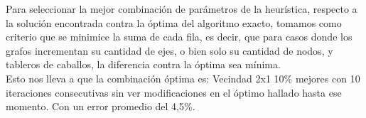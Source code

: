 \newpage

Para seleccionar la mejor combinaci\'on de par\'ametros de la heur\'istica, respecto a la soluci\'on encontrada contra la \'optima del algoritmo exacto, tomamos como criterio que se minimice la suma de cada fila, es decir, que para casos donde los grafos incrementan su cantidad de ejes, o bien solo su cantidad de nodos, y tableros de caballos, la diferencia contra la \'optima sea m\'inima.\\

Esto nos lleva a que la combinaci\'on \'optima es: Vecindad 2x1 10\% mejores con 10 iteraciones consecutivas sin ver modificaciones en el \'optimo hallado hasta ese momento. Con un error promedio del 4,5\%.


